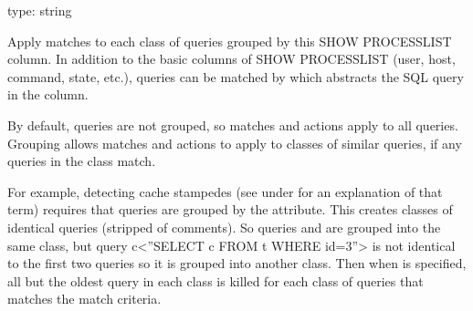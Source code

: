 \documentclass[letterpaper,10pt,english]{sphinxmanual}
\begin{document}
\begin{fulllineitems}
\label{\detokenize{mariadb-kill:cmdoption-mariadb-kill-group-by}}
\sphinxAtStartPar
type: string

\sphinxAtStartPar
Apply matches to each class of queries grouped by this SHOW PROCESSLIST column.
In addition to the basic columns of SHOW PROCESSLIST (user, host, command,
state, etc.), queries can be matched by  which abstracts the
SQL query in the  column.

\sphinxAtStartPar
By default, queries are not grouped, so matches and actions apply to all
queries.  Grouping allows matches and actions to apply to classes of
similar queries, if any queries in the class match.

\sphinxAtStartPar
For example, detecting cache stampedes (see  under
{\hyperref[\detokenize{mariadb-kill:cmdoption-mariadb-kill-victims}]{}} for an explanation of that term) requires that queries are
grouped by the  attribute.  This creates classes of identical queries
(stripped of comments).  So queries  and
 are grouped into the same class, but
query c\textless{}”SELECT c FROM t WHERE id=3”\textgreater{} is not identical to the first two
queries so it is grouped into another class. Then when {\hyperref[\detokenize{mariadb-kill:cmdoption-mariadb-kill-victims}]{}}
 is specified, all but the oldest query in each class is
killed for each class of queries that matches the match criteria.

\end{fulllineitems}

\end{document}
